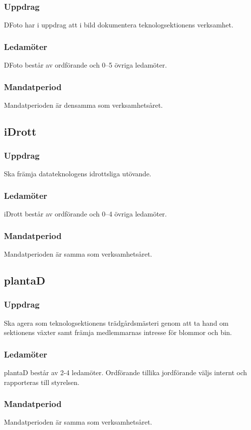 \subsubsection{Uppdrag}
DFoto har i uppdrag att i bild dokumentera teknologsektionens verksamhet.
\subsubsection{Ledamöter}
DFoto består av ordförande och 0--5 övriga ledamöter.
\subsubsection{Mandatperiod}
Mandatperioden är densamma som verksamhetsåret.

\subsection{iDrott}
\subsubsection{Uppdrag}
Ska främja datateknologens idrottsliga utövande. 
\subsubsection{Ledamöter}
iDrott består av ordförande och 0--4 övriga ledamöter. 
\subsubsection{Mandatperiod}
Mandatperioden är samma som verksamhetsåret. 

\subsection{plantaD}
\subsubsection{Uppdrag}
Ska agera som teknologsektionens trädgårdsmästeri genom att ta hand om sektionens växter samt främja medlemmarnas intresse för blommor och bin.
\subsubsection{Ledamöter}
plantaD består av 2-4 ledamöter. Ordförande tillika jordförande väljs internt och rapporteras till styrelsen.
\subsubsection{Mandatperiod}
Mandatperioden är samma som verksamhetsåret.

